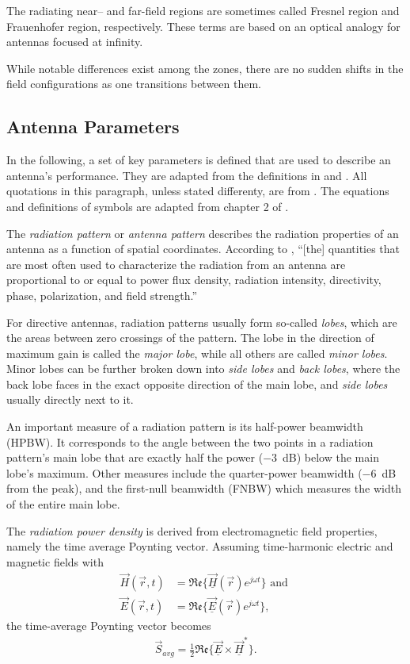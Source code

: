 The radiating near-- and far-field regions are sometimes called Fresnel region and Frauenhofer region, respectively.
These terms are based on an optical analogy for antennas focused at infinity.

While notable differences exist among the zones,
there are no sudden shifts in the field configurations as one transitions between them.

\subsection{Antenna Parameters}
\label{sec:antenna_params}
In the following, a set of key parameters is defined that are used to describe an antenna's performance.
They are adapted from the definitions in \cite{ieee_defs} and \cite{balanis}.
All quotations in this paragraph, unless stated differenty, are from \cite{ieee_defs}.
The equations and definitions of symbols are adapted from chapter 2 of \cite{balanis}.

The \emph{radiation pattern} or \emph{antenna pattern}
describes the radiation properties of an antenna as a function of spatial coordinates.
According to \cite{ieee_defs}, ``[the] quantities that are most often used to characterize the radiation from an antenna
are proportional to or equal to power flux density,
radiation intensity, directivity, phase, polarization, and field strength.''

For directive antennas, radiation patterns usually form so-called \emph{lobes},
which are the areas between zero crossings of the pattern.
The lobe in the direction of maximum gain is called the \emph{major lobe},
while all others are called \emph{minor lobes}.
Minor lobes can be further broken down into \emph{side lobes} and \emph{back lobes},
where the back lobe faces in the exact opposite direction of the main lobe,
and \emph{side lobes} usually directly next to it.

An important measure of a radiation pattern is its half-power beamwidth (HPBW).
It corresponds to the angle between the two points
in a radiation pattern's main lobe that are exactly half the power (\SI{-3}{\dB})
below the main lobe's maximum. Other measures include the quarter-power beamwidth
(\SI{-6}{\dB} from the peak), and the first-null beamwidth (FNBW) which measures the width of the entire main lobe.

The \emph{radiation power density} is derived from electromagnetic field properties,
namely the time average Poynting vector.
Assuming time-harmonic electric and magnetic fields with
\begin{align}
    \vec H(\vec r, t) & = \mathfrak{Re}\{\vec{\underline{H}}(\vec{r}) e^{j\omega t}\} \text{ and } \\
    \vec E(\vec r, t) & = \mathfrak{Re}\{\vec{\underline{E}}(\vec{r}) e^{j\omega t}\},
\end{align}
the time-average Poynting vector becomes
\begin{align}
    \vec S_{avg} = \frac{1}{2} \mathfrak{Re}\{ \underline{\vec E} \times \underline{\vec H}^* \}.
\end{align}

